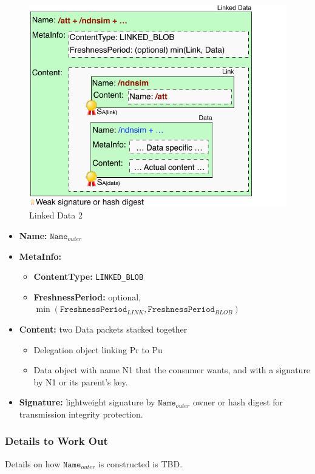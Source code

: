 \documentclass[10pt]{article}
\begin{document}
\begin{figure}[h]
  \centering
  \includegraphics[scale=0.8]{linked-data2}
  \caption{Linked Data 2}
  \label{fig:linked-dat}
\end{figure}

\begin{itemize}
\item \textbf{Name:} $\mathtt{Name}_{outer}$
\item \textbf{MetaInfo:}
  \begin{itemize}
  \item \textbf{ContentType:} \verb|LINKED_BLOB|
  \item \textbf{FreshnessPeriod:} optional, $\min(\mathtt{FreshnessPeriod}_{LINK}, \mathtt{FreshnessPeriod}_{BLOB})$
  \end{itemize}
\item \textbf{Content:} two Data packets stacked together
  \begin{itemize}
  \item Delegation object linking Pr to Pu
  \item Data object with name N1 that the consumer wants, and with a signature by N1 or its parent's key.
  \end{itemize}

\item \textbf{Signature:} lightweight signature by $\mathtt{Name}_{outer}$ owner or hash digest for transmission integrity protection.

\end{itemize}


\subsubsection{Details to Work Out}


Details on how $\mathtt{Name}_{outer}$ is constructed is TBD.

% 
% 
\end{document}
